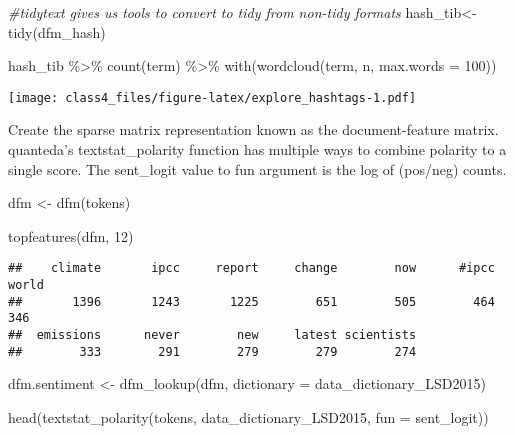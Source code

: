\documentclass[
]{article}
\newenvironment{Shaded}{\begin{snugshade}}{\end{snugshade}}
\newcommand{\AttributeTok}[1]{\textcolor[rgb]{0.77,0.63,0.00}{#1}}
\newcommand{\CommentTok}[1]{\textcolor[rgb]{0.56,0.35,0.01}{\textit{#1}}}
\newcommand{\DecValTok}[1]{\textcolor[rgb]{0.00,0.00,0.81}{#1}}
\newcommand{\FunctionTok}[1]{\textcolor[rgb]{0.00,0.00,0.00}{#1}}
\newcommand{\NormalTok}[1]{#1}
\newcommand{\OtherTok}[1]{\textcolor[rgb]{0.56,0.35,0.01}{#1}}
\newcommand{\SpecialCharTok}[1]{\textcolor[rgb]{0.00,0.00,0.00}{#1}}
\begin{document}
\begin{Shaded}
\begin{Highlighting}[]
\CommentTok{\#tidytext gives us tools to convert to tidy from non{-}tidy formats}
\NormalTok{hash\_tib}\OtherTok{\textless{}{-}} \FunctionTok{tidy}\NormalTok{(dfm\_hash)}

\NormalTok{hash\_tib }\SpecialCharTok{\%\textgreater{}\%}
   \FunctionTok{count}\NormalTok{(term) }\SpecialCharTok{\%\textgreater{}\%}
   \FunctionTok{with}\NormalTok{(}\FunctionTok{wordcloud}\NormalTok{(term, n, }\AttributeTok{max.words =} \DecValTok{100}\NormalTok{))}
\end{Highlighting}
\end{Shaded}

\texttt{[image: class4\_files/figure-latex/explore\_hashtags-1.pdf]}

Create the sparse matrix representation known as the document-feature
matrix. quanteda's textstat\_polarity function has multiple ways to
combine polarity to a single score. The sent\_logit value to fun
argument is the log of (pos/neg) counts.

\begin{Shaded}
\begin{Highlighting}[]
\NormalTok{dfm }\OtherTok{\textless{}{-}} \FunctionTok{dfm}\NormalTok{(tokens)}

\FunctionTok{topfeatures}\NormalTok{(dfm, }\DecValTok{12}\NormalTok{)}
\end{Highlighting}
\end{Shaded}

\begin{verbatim}
##    climate       ipcc     report     change        now      #ipcc      world 
##       1396       1243       1225        651        505        464        346 
##  emissions      never        new     latest scientists 
##        333        291        279        279        274
\end{verbatim}

\begin{Shaded}
\begin{Highlighting}[]
\NormalTok{dfm.sentiment }\OtherTok{\textless{}{-}} \FunctionTok{dfm\_lookup}\NormalTok{(dfm, }\AttributeTok{dictionary =}\NormalTok{ data\_dictionary\_LSD2015)}

\FunctionTok{head}\NormalTok{(}\FunctionTok{textstat\_polarity}\NormalTok{(tokens, data\_dictionary\_LSD2015, }\AttributeTok{fun =}\NormalTok{ sent\_logit))}
\end{Highlighting}
\end{Shaded}
\end{document}
